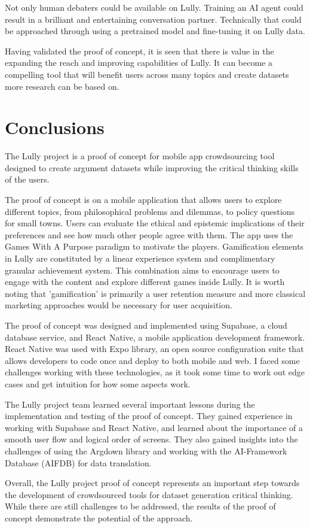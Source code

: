 \documentclass{article}
\begin{document}
Not only human debaters could be available on Lully. Training an AI agent could result in a brilliant and entertaining conversation partner. Technically that could be approached through using a pretrained model and fine-tuning it on Lully data.

Having validated the proof of concept, it is seen that there is value in the expanding the reach and improving capabilities of Lully. It can become a compelling tool that will benefit users across many topics and create datasets more research can be based on.

\newpage

\chapter{Conclusions}

The Lully project is a proof of concept for mobile app crowdsourcing tool designed to create argument datasets while improving the critical thinking skills of the users. 

The proof of concept is on a mobile application that allows users to explore different topics, from philosophical problems and dilemmas, to policy questions for small towns. Users can evaluate the ethical and epistemic implications of their preferences and see how much other people agree with them. The app uses the Games With A Purpose paradigm to motivate the players. Gamification elements in Lully are constituted by a linear experience system and complimentary granular achievement system. This combination aims to encourage users to engage with the content and explore different games inside Lully. It is worth noting that 'gamification' is primarily a user retention measure and more classical marketing approaches would be necessary for user acquisition.

The proof of concept was designed and implemented using Supabase, a cloud database service, and React Native, a mobile application development framework. React Native was used with Expo library, an open source configuration suite that allows developers to code once and deploy to both mobile and web. I faced some challenges working with these technologies, as it took some time to work out edge cases and get intuition for how some aspects work.


The Lully project team learned several important lessons during the implementation and testing of the proof of concept. They gained experience in working with Supabase and React Native, and learned about the importance of a smooth user flow and logical order of screens. They also gained insights into the challenges of using the Argdown library and working with the AI-Framework Database (AIFDB) for data translation.

Overall, the Lully project proof of concept represents an important step towards the development of crowdsourced tools for dataset generation critical thinking. While there are still challenges to be addressed, the results of the proof of concept demonstrate the potential of the approach.

\newpage
\end{document}
